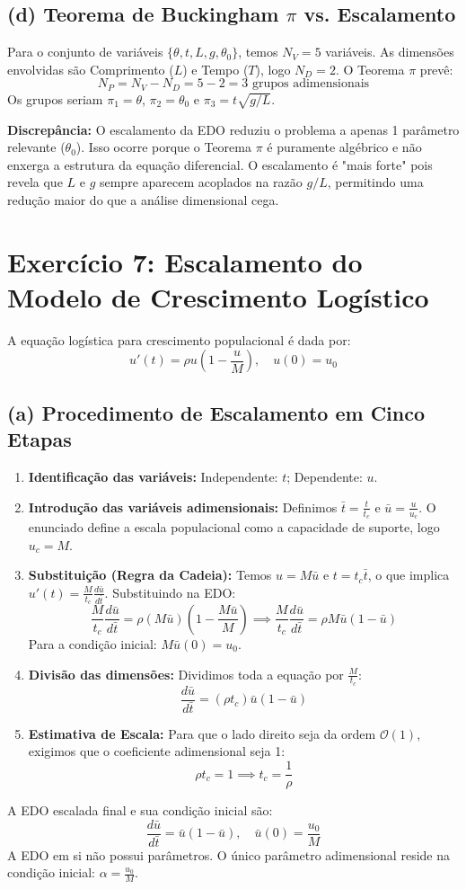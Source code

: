 \documentclass{article}
\begin{document}
\subsection*{(d) Teorema de Buckingham $\pi$ vs. Escalamento}
Para o conjunto de variáveis $\{\theta, t, L, g, \theta_0\}$, temos $N_V = 5$ variáveis. As dimensões envolvidas são Comprimento ($L$) e Tempo ($T$), logo $N_D = 2$. O Teorema $\pi$ prevê:
\[ N_P = N_V - N_D = 5 - 2 = 3 \text{ grupos adimensionais} \]
Os grupos seriam $\pi_1 = \theta$, $\pi_2 = \theta_0$ e $\pi_3 = t\sqrt{g/L}$.

\textbf{Discrepância:} O escalamento da EDO reduziu o problema a apenas 1 parâmetro relevante ($\theta_0$). Isso ocorre porque o Teorema $\pi$ é puramente algébrico e não enxerga a estrutura da equação diferencial. O escalamento é "mais forte" pois revela que $L$ e $g$ sempre aparecem acoplados na razão $g/L$, permitindo uma redução maior do que a análise dimensional cega.

\section*{Exercício 7: Escalamento do Modelo de Crescimento Logístico}

A equação logística para crescimento populacional é dada por:
\[ u'(t) = \rho u \left(1 - \frac{u}{M}\right), \quad u(0) = u_0 \]

\subsection*{(a) Procedimento de Escalamento em Cinco Etapas}
\begin{enumerate}
    \item \textbf{Identificação das variáveis:} Independente: $t$; Dependente: $u$.
    \item \textbf{Introdução das variáveis adimensionais:} Definimos $\bar{t} = \frac{t}{t_c}$ e $\bar{u} = \frac{u}{u_c}$. O enunciado define a escala populacional como a capacidade de suporte, logo $u_c = M$.
    \item \textbf{Substituição (Regra da Cadeia):} Temos $u = M\bar{u}$ e $t = t_c\bar{t}$, o que implica $u'(t) = \frac{M}{t_c}\frac{d\bar{u}}{d\bar{t}}$. Substituindo na EDO:
    \[ \frac{M}{t_c}\frac{d\bar{u}}{d\bar{t}} = \rho (M\bar{u}) \left(1 - \frac{M\bar{u}}{M}\right) \implies \frac{M}{t_c}\frac{d\bar{u}}{d\bar{t}} = \rho M \bar{u}(1 - \bar{u}) \]
    Para a condição inicial: $M\bar{u}(0) = u_0$.
    \item \textbf{Divisão das dimensões:} Dividimos toda a equação por $\frac{M}{t_c}$:
    \[ \frac{d\bar{u}}{d\bar{t}} = (\rho t_c) \bar{u}(1 - \bar{u}) \]
    \item \textbf{Estimativa de Escala:} Para que o lado direito seja da ordem $\mathcal{O}(1)$, exigimos que o coeficiente adimensional seja 1:
    \[ \rho t_c = 1 \implies t_c = \frac{1}{\rho} \]
\end{enumerate}
A EDO escalada final e sua condição inicial são:
\[ \frac{d\bar{u}}{d\bar{t}} = \bar{u}(1 - \bar{u}), \quad \bar{u}(0) = \frac{u_0}{M} \]
A EDO em si não possui parâmetros. O único parâmetro adimensional reside na condição inicial: $\alpha = \frac{u_0}{M}$.
\end{document}
